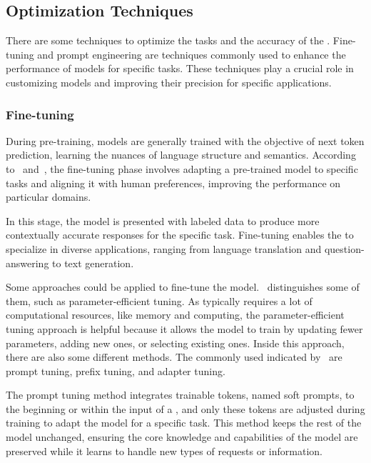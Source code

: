 \subsection{Optimization Techniques}

There are some techniques to optimize the tasks and the accuracy of the {\llm}. Fine-tuning and prompt engineering are techniques commonly used to enhance the performance of models for specific tasks. These techniques play a crucial role in customizing models and improving their precision for specific applications.


\subsubsection{Fine-tuning}

During pre-training, models are generally trained with the objective of next token prediction, learning the nuances of language structure and semantics. According to~\citet{kamnis_generative_2023} and~\citet{hadi_LLM_2023}, the fine-tuning phase involves adapting a pre-trained model to specific tasks and aligning it with human preferences, improving the performance on particular domains.

In this stage, the model is presented with labeled data to produce more contextually accurate responses for the specific task. Fine-tuning enables the {\llm} to specialize in diverse applications, ranging from language translation and question-answering to text generation. 

Some approaches could be applied to fine-tune the model.~\citet{naveed_comprehensive_2023} distinguishes some of them, such as parameter-efficient tuning. As {\llm} typically requires a lot of computational resources, like memory and computing, the parameter-efficient tuning approach is helpful because it allows the model to train by updating fewer parameters, adding new ones, or selecting existing ones. Inside this approach, there are also some different methods. The commonly used indicated by~\citet{naveed_comprehensive_2023} are prompt tuning, prefix tuning, and adapter tuning.

The prompt tuning method integrates trainable tokens, named soft prompts, to the beginning or within the input of a {\llm}, and only these tokens are adjusted during training to adapt the model for a specific task. This method keeps the rest of the model unchanged, ensuring the core knowledge and capabilities of the model are preserved while it learns to handle new types of requests or information.

